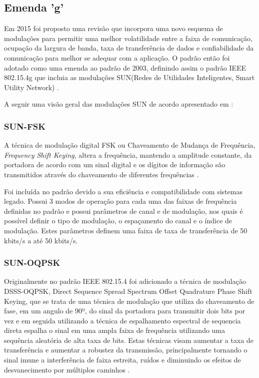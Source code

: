 \subsection*{Emenda 'g'}
Em 2015 foi proposto uma revisão que incorpora uma novo esquema de modulações para permitir uma melhor volatilidade entre a faixa de comunicação, ocupação da largura de banda, taxa de transferência de dados e confiabilidade da comunicação para melhor se adequar com a aplicação. O padrão então foi adotado como uma emenda ao padrão de 2003, definindo assim o padrão IEEE 802.15.4g que incluia as modulações SUN(Redes de Utilidades Inteligentes, Smart Utility Network) \cite{tuset2020reliability}.

A seguir uma visão geral das modulações SUN de acordo apresentado em \cite{tuset2020reliability}:

\subsubsection*{SUN-FSK}
A técnica de modulação digital FSK ou Chaveamento de Mudança de Frequência, \emph{Frequency Shift Keying}, altera a frequência, mantendo a amplitude constante, da portadora de acordo com um sinal digital e os dígitos de informação são transmitidos através do chaveamento de diferentes frequências \cite{lathi2012}.

Foi incluída no padrão devido a sua eficiência e compatibilidade com sistemas legado. Possui 3 modos de operação para cada uma das faixas de frequência definidas no padrão e possui parâmetros de canal e de modulação, nos quais é possível definir o tipo de modulação, o espaçamento do canal e o índice de modulação. Estes parâmetros definem uma faixa de taxa de transferência de 50 kbits/s a até 50 kbits/s.

\subsubsection*{SUN-OQPSK}
Originalmente no padrão IEEE 802.15.4 foi adicionado a técnica de modulação DSSS-OQPSK, Direct Sequence Spread Spectrum Offset Quadrature Phase Shift Keying, que se trata de uma técnica de modulação que utiliza do chaveamento de fase, em um angulo de 90º, do sinal da portadora para transmitir dois bits por vez e em seguida utilizando a técnica de espalhamento espectral de sequencia direta espalha o sinal em uma ampla faixa de frequência utilizando uma sequência aleatória de alta taxa de bits. Estas técnicas visam aumentar a taxa de transferência e aumentar a robustez da transmissão, principalmente tornando o sinal imune a interferência de faixa estreita, ruídos e diminuindo os efeitos de desvanecimento por múltiplos caminhos \cite{goldsmith2005wireless}.

